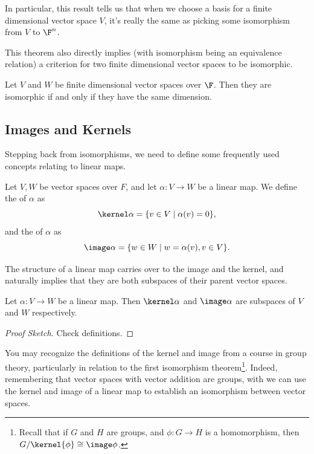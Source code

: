In particular, this result tells us that when we choose a basis for a finite dimensional vector space $V$, it's really the same as picking some isomorphism from $V$ to $\F^n$. 

This theorem also directly implies (with isomorphism being an equivalence relation) a criterion for two finite dimensional vector spaces to be isomorphic.

\begin{theorem}
    Let $V$ and $W$ be finite dimensional vector spaces over $\F$. Then they are isomorphic if and only if they have the same dimension.
\end{theorem}

\subsection{Images and Kernels}

Stepping back from isomorphisms, we need to define some frequently used concepts relating to linear maps.

\begin{definition}
    Let $V, W$ be vector spaces over $F$, and let $\alpha: V \rightarrow W$ be a linear map. We define the  of $\alpha$ as
    $$
    \kernel \alpha = \{ v\in V \mid \alpha(v) = 0\},
    $$
    and the  of $\alpha$ as
    $$
    \image \alpha = \{ w \in W \mid w = \alpha(v), v \in V\}.
    $$
\end{definition}

The structure of a linear map carries over to the image and the kernel, and naturally implies that they are both subspaces of their parent vector spaces.

\begin{lemma}
    Let $\alpha: V \rightarrow W$ be a linear map. Then $\kernel \alpha$ and $\image \alpha$ are subspaces of $V$ and $W$ respectively.
\end{lemma}
\begin{proof}[Proof Sketch]
    Check definitions.
\end{proof}

You may recognize the definitions of the kernel and image from a course in group theory, particularly in relation to the first isomorphism theorem\footnote{Recall that if $G$ and $H$ are groups, and $\phi: G \rightarrow H$ is a homomorphism, then $G/\kernel{\phi} \cong \image \phi$.}. Indeed, remembering that vector spaces with vector addition are groups, with we can use the kernel and image of a linear map to establish an isomorphism between vector spaces.

